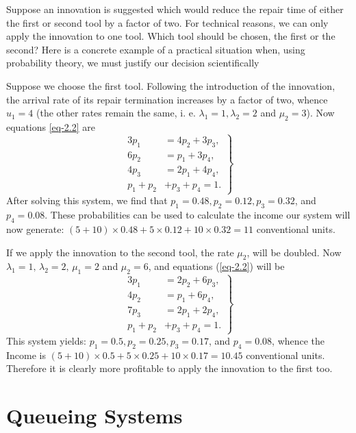 Suppose an innovation is suggested which would reduce the repair time of either the ﬁrst or second tool by a factor of two. For technical reasons, we can only apply the innovation to one tool. Which tool should be chosen, the ﬁrst or the second? Here is a concrete example of a practical situation when, using probability theory, we must justify our decision scientifically

Suppose we choose the ﬁrst tool. Following the introduction of the
innovation, the arrival rate of its repair termination increases by a
factor of two, whence $u_{1} = 4$ (the other rates remain the same,
i. e. $\lambda_{1} = 1, \lambda_{2} = 2$ and $\mu_{2} =3$). Now
equations \eqref{eq-2.2} are 
\begin{equation*}
\left.
\begin{split}
3p_{1} & = 4p_{2} + 3p_{3}, \\
6p_{2} & = p_{1} + 3p_{4}, \\
4p_{3} & = 2p_{1} + 4p_{4}, \\
p_{1} +p_{2}&+p_{3}+p_{4}= 1.
\end{split}
\right\}
\end{equation*}
After solving this system, we ﬁnd that $p_{1} = 0.48, p_{2} = 0.12, p_{3} = 0.32$, and $p_{4} =0.08$. These probabilities can be used to calculate the income our system will now generate: $(5+ 10) \times 0.48+5 \times 0.12+ 10 \times 0.32 = 11$ conventional units. 

If we apply the innovation to the second tool, the rate $\mu_{2}$, will be doubled. Now $\lambda_{1}  = 1,\, \lambda_{2} = 2, \, \mu_{1} = 2$ and $\mu_{2} = 6$, and equations (\ref{eq-2.2}) will be 
\begin{equation*}
\left.
\begin{split}
3p_{1} & = 2p_{2} + 6p_{3}, \\
4p_{2} & = p_{1} + 6p_{4}, \\
7p_{3} & = 2p_{1} + 2p_{4}, \\
p_{1} +p_{2}&+p_{3}+p_{4}= 1.
\end{split}
\right\}
\end{equation*}
This system yields: $p_{1} = 0.5, p_{2} = 0.25, p_{3} = 0.17$, and $p_{4} =0.08$,
whence the Income is $(5+ 10) \times 0.5+5 \times 0.25+10 \times 0.17=10.45$
conventional units. Therefore it is clearly more profitable to apply
the innovation to the first too.

\section{Queueing Systems}

